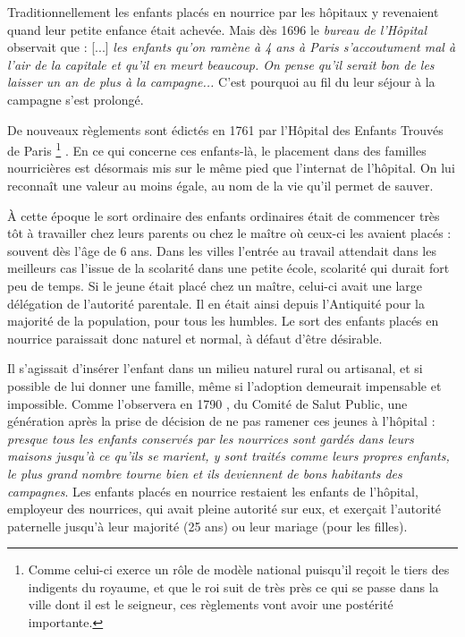 Traditionnellement les enfants placés en nourrice par les hôpitaux y revenaient quand leur petite enfance était achevée. Mais dès 1696 le \emph{bureau de l'Hôpital} observait que : [...] \emph{les enfants qu'on ramène à 4 ans à Paris s'accoutument mal à l'air de la capitale et qu'il en meurt beaucoup. On pense qu'il serait bon de les laisser un an de plus à la campagne...} C'est pourquoi au fil du  leur séjour à la campagne s'est prolongé.

 De nouveaux règlements sont édictés en 1761 par l'Hôpital des Enfants Trouvés de Paris%
\footnote{Comme celui-ci exerce un rôle de modèle national puisqu'il reçoit le tiers des indigents du royaume, et que le roi suit de très près ce qui se passe dans la ville dont il est le seigneur, ces règlements vont avoir une postérité importante.}%
. En ce qui concerne ces enfants-là, le placement dans des familles nourricières est désormais mis sur le même pied que l'internat de l'hôpital. On lui reconnaît une valeur au moins égale, au nom de la vie qu'il permet de sauver. 

 À cette époque le sort ordinaire des enfants ordinaires était de commencer très tôt à travailler chez leurs parents ou chez le maître où ceux-ci les avaient placés : souvent dès l'âge de 6 ans. Dans les villes l'entrée au travail attendait dans les meilleurs cas l'issue de la scolarité dans une petite école, scolarité qui durait fort peu de temps. Si le jeune était placé chez un maître, celui-ci avait une large délégation de l'autorité parentale. Il en était ainsi depuis l'Antiquité pour la majorité de la population, pour tous les humbles. Le sort des enfants placés en nourrice paraissait donc naturel et normal, à défaut d'être désirable.

 Il s'agissait d'insérer l'enfant dans un milieu naturel rural ou artisanal, et si possible de lui donner une famille, même si l'adoption demeurait impensable et impossible. Comme l'observera en 1790 , du Comité de Salut Public, une génération après la prise de décision de ne pas ramener ces jeunes à l'hôpital : \emph{presque tous les enfants conservés par les nourrices sont gardés dans leurs maisons jusqu'à ce qu'ils se marient, y sont traités comme leurs propres enfants, le plus grand nombre tourne bien et ils deviennent de bons habitants des campagnes}. Les enfants placés en nourrice restaient les enfants de l'hôpital, employeur des nourrices, qui avait pleine autorité sur eux, et exerçait l'autorité paternelle jusqu'à leur majorité (25 ans) ou leur mariage (pour les filles). 

